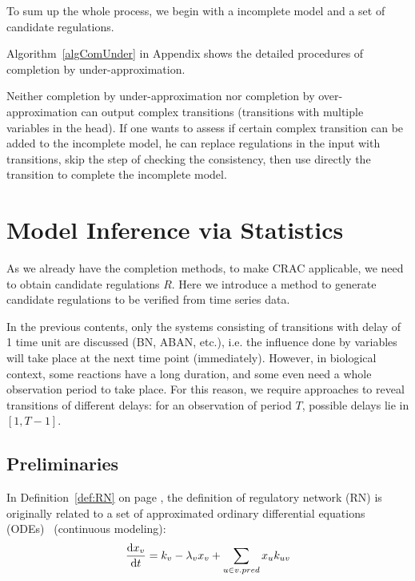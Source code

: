 To sum up the whole process, we begin with a incomplete model and a set of candidate regulations.


Algorithm~\ref{algComUnder} in Appendix shows the detailed procedures of completion by under-approximation.

\begin{remark}
Neither completion by under-approximation nor completion by over-approximation can output complex transitions (transitions with multiple variables in the head).
If one wants to assess if certain complex transition can be added to the incomplete model, he can replace regulations in the input with transitions, skip the step of checking the consistency, then use directly the transition to complete the incomplete model.
\end{remark}

\section{Model Inference via Statistics}
As we already have the completion methods, to make CRAC applicable, we need to obtain candidate regulations $R$.
Here we introduce a method to generate candidate regulations to be verified from time series data.

In the previous contents, only the systems consisting of transitions with delay of 1 time unit are discussed (BN, ABAN, etc.), i.e. the influence done by variables will take place at the next time point (immediately).
However, in biological context, some reactions have a long duration, and some even need a whole observation period to take place.
For this reason, we require approaches to reveal transitions of different delays: for an observation of period $T$, possible delays lie in $[1,T-1]$.

\subsection{Preliminaries}
In Definition~\ref{def:RN} on page \pageref{def:RN}, the definition of regulatory network (RN) is originally related to a set of approximated ordinary differential equations (ODEs)~\cite{khalis2009smbionet} (continuous modeling):
\begin{equation}\label{eq:differentialEquation}
    \dfrac{{\rm d}x_v}{{\rm d}t}=k_v-\lambda_v x_v +\sum_{u\in v.pred}{x_uk_{uv}}
\end{equation}

